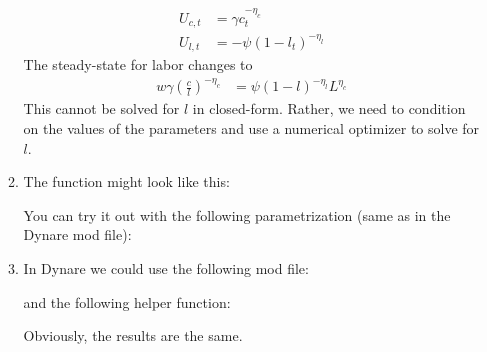 \begin{enumerate}
\begin{enumerate}
\begin{align*}
	U_{c,t} &= \gamma c_t^{-\eta_c}
	\\
	U_{l,t} &= - \psi (1-l_t)^{-\eta_l}
	\end{align*}
	The steady-state for labor changes to
	\begin{align*}
	w \gamma \left(\frac{c}{l}\right)^{-\eta_c} &= \psi{(1-l)}^{-\eta_l}L^{\eta_c}
	\end{align*}
	This cannot be solved for \(l\) in closed-form.
	Rather, we need to condition on the values of the parameters and use a numerical optimizer to solve for \(l\).
	\item The function might look like this:
	
	You can try it out with the following parametrization (same as in the Dynare mod file):
	
	\item In Dynare we could use the following mod file:
	
	and the following helper function:
	
	Obviously, the results are the same.
\end{enumerate}

\end{enumerate}